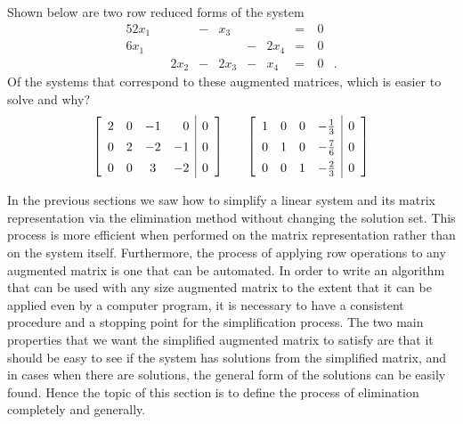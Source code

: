 \begin{pa}
\begin{enumerate}[i.]
	\end{enumerate}
	
	\item Shown below are two row reduced forms of the system 
	\begin{alignat*}{5}
{2}x_1 	&{}		&{}		&{}-{}	&{}x_3	&{}		&{} 			&{}={}	& \ 0&{}   \\
{6}x_1	&{} 		&{} 		&{}		&{}		&{}-{}	&{2}x_4 	&{}={} 	& \ 0&{} \\
{}			&{}		&{2}x_2	&{}-{} 	&{2}x_3	&{}-{}	&{}x_4		&{}={} 	& \ 0&{.}
\end{alignat*} 
Of the systems that correspond to these augmented matrices, which is easier to solve and why?
\[\left[ \begin{array}{cccr|c} 2 & 0 & -1 & 0 & 0 \\ 0 & 2 & -2 & -1 & 0 \\ 0 & 0 & 3 & -2 & 0 \end{array} \right] \hspace{0.25in} \left[ \renewcommand{\arraystretch}{1.4} \begin{array}{cccr|c} 1 & 0 & 0 & -\frac{1}{3} & 0 \\ 0 & 1 & 0 & -\frac{7}{6} & 0 \\ 0 & 0 & 1 & -\frac{2}{3} & 0 \end{array} \right]\]	

\ee

\end{pa}


\label{sec:mtx_ech_forms}

In the previous sections we saw how to simplify a linear system and its matrix representation via the elimination method without changing the solution set. This process is more efficient when performed on the matrix representation rather than on the system itself. Furthermore, the process of applying row operations to any augmented matrix is one that can be automated. In order to write an algorithm that can be used with any size augmented matrix to the extent that it can be applied even by a computer program, it is necessary to have a consistent procedure and a stopping point for the simplification process. The two main properties that we want the simplified augmented matrix to satisfy are that it should be easy to see if the system has solutions from the simplified matrix, and in cases when there are solutions, the general form of the solutions can be easily found. Hence the topic of this section is to define the process of elimination completely and generally.

